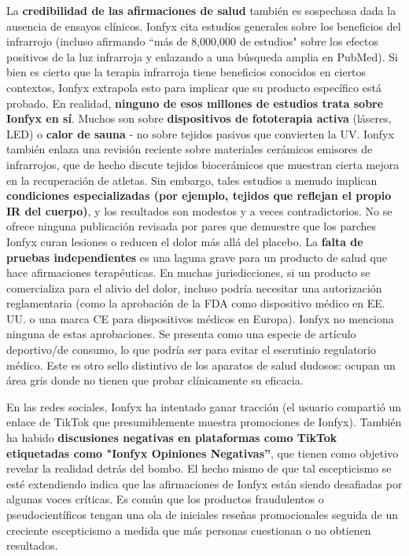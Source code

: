 \documentclass{article}
\begin{document}
La \textbf{credibilidad de las afirmaciones de salud} también es sospechosa dada la ausencia de ensayos clínicos. Ionfyx cita estudios generales sobre los beneficios del infrarrojo (incluso afirmando “más de 8,000,000 de estudios" sobre los efectos positivos de la luz infrarroja y enlazando a una búsqueda amplia en PubMed). Si bien es cierto que la terapia infrarroja tiene beneficios conocidos en ciertos contextos, Ionfyx extrapola esto para implicar que su producto específico está probado. En realidad, \textbf{ninguno de esos millones de estudios trata sobre Ionfyx en sí}. Muchos son sobre \textbf{dispositivos de fototerapia activa} (láseres, LED) o \textbf{calor de sauna} - no sobre tejidos pasivos que convierten la UV. Ionfyx también enlaza una revisión reciente sobre materiales cerámicos emisores de infrarrojos, que de hecho discute tejidos biocerámicos que muestran cierta mejora en la recuperación de atletas. Sin embargo, tales estudios a menudo implican \textbf{condiciones especializadas (por ejemplo, tejidos que reflejan el propio IR del cuerpo)}, y los resultados son modestos y a veces contradictorios. No se ofrece ninguna publicación revisada por pares que demuestre que los parches Ionfyx curan lesiones o reducen el dolor más allá del placebo. La \textbf{falta de pruebas independientes} es una laguna grave para un producto de salud que hace afirmaciones terapéuticas. En muchas jurisdicciones, si un producto se comercializa para el alivio del dolor, incluso podría necesitar una autorización reglamentaria (como la aprobación de la FDA como dispositivo médico en EE. UU. o una marca CE para dispositivos médicos en Europa). Ionfyx no menciona ninguna de estas aprobaciones. Se presenta como una especie de artículo deportivo/de consumo, lo que podría ser para evitar el escrutinio regulatorio médico. Este es otro sello distintivo de los aparatos de salud dudosos: ocupan un área gris donde no tienen que probar clínicamente su eficacia.

En las redes sociales, Ionfyx ha intentado ganar tracción (el usuario compartió un enlace de TikTok que presumiblemente muestra promociones de Ionfyx). También ha habido \textbf{discusiones negativas en plataformas como TikTok etiquetadas como "Ionfyx Opiniones Negativas”}, que tienen como objetivo revelar la realidad detrás del bombo. El hecho mismo de que tal escepticismo se esté extendiendo indica que las afirmaciones de Ionfyx están siendo desafiadas por algunas voces críticas. Es común que los productos fraudulentos o pseudocientíficos tengan una ola de iniciales reseñas promocionales seguida de un creciente escepticismo a medida que más personas cuestionan o no obtienen resultados.
\end{document}

